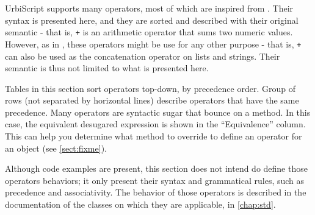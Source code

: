 \documentclass[openright,twoside,12pt]{report}
\newcommand{\us}{UrbiScript\xspace}
\newcommand{\sect}[1]{\autoref{sect:#1}}
\begin{document}
\us supports many operators, most of which are inspired from
\Cxx. Their syntax is presented here, and they are sorted and
described with their original semantic - that is, \lstinline|+| is an
arithmetic operator that sums two numeric values. However, as in \Cxx,
these operators might be use for any other purpose - that is,
\lstinline|+| can also be used as the concatenation operator on lists
and strings. Their semantic is thus not limited to what is presented
here.

Tables in this section sort operators top-down, by precedence order.
Group of rows (not separated by horizontal lines) describe operators
that have the same precedence. Many operators are syntactic sugar that
bounce on a method. In this case, the equivalent desugared expression
is shown in the ``Equivalence'' column. This can help you determine
what method to override to define an operator for an object (see
\sect{fixme}).

Although code examples are present, this section does not intend do
define those operators behaviors; it only present their syntax and
grammatical rules, such as precedence and associativity. The behavior
of those operators is described in the documentation of the classes on
which they are applicable, in \autoref{chap:std}.

\newcommand{\operatorhead}{Operator & Use & Associativity & Original semantic
  & Equivalence\\}


\newcommand{\operator}[5]{\lstinline@#1@&\lstinline@#2@&#3&#4&\lstinline@#5@\\}
\newcommand{\boperator}[3]{\operator{#1}{a #1 b}{#2}{#3}{a.'#1'(b)}}
\newcommand{\poperator}[3]{\operator{#1}{#1a}{#2}{#3}{a.'#1'()}}

\newcommand{\operatordot}    {\operator  {.}    {a.b}              {-}     {Message sending}          {Not redefinable}       }
\newcommand{\operatordota}   {\operator  {.}    {a.b(args)}        {-}     {Message sending}          {Not redefinable}       }
\newcommand{\operatorsub}    {\operator  {[]}   {a[args]}          {-}     {Subscript}                {a.'[]'(args)}          }
\newcommand{\operatorsubass} {\operator  {[] =} {a[args] = v}      {-}     {Subscript assignment}     {a.'[]='(args, v)}      }
\newcommand{\operatorass}    {\operator  {=}    {a = b}            {Right} {Assignment}               {updateSlot("a", b)}    }
\newcommand{\operatoriass}[1]{\operator  {#1=}  {a #1= b}          {Right} {In place assignment}      {a = a #1 b}            }
\newcommand{\operatorsiass}  {
    \operatoriass{+}
    \operatoriass{-}
    \operatoriass{*}
    \operatoriass{/}
    \operatoriass{\%}
    \operatoriass{\^}
    \operatoriass{\~}
}
\newcommand{\operatorinc}    {\operator  {++}   {a++}              {-}     {Incrementation}           {(a = a + 1) - 1}       }
\newcommand{\operatordec}    {\operator  {--}   {a--}              {-}     {Incrementation}           {(a = a - 1) + 1}       }
\end{document}
